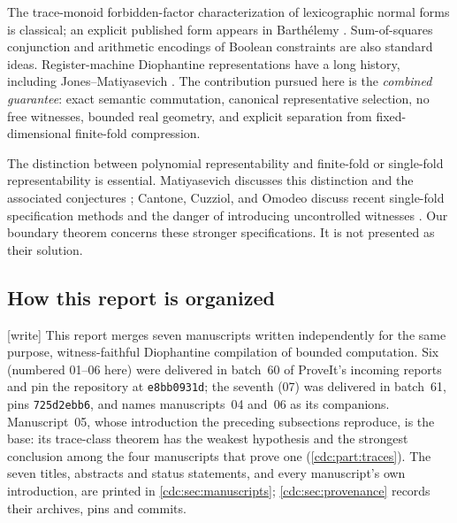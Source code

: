 \documentclass[11pt,a4paper]{article}
\theoremstyle{definition}
\theoremstyle{remark}
\newcommand{\wtag}{\textup{[write]}}%
\begin{document}
The trace-monoid forbidden-factor characterization of lexicographic normal forms is classical; an explicit published form appears in Barth\'elemy \cite{barthelemy}. Sum-of-squares conjunction and arithmetic encodings of Boolean constraints are also standard ideas. Register-machine Diophantine representations have a long history, including Jones--Matiyasevich \cite{jm1984}. The contribution pursued here is the \emph{combined guarantee}: exact semantic commutation, canonical representative selection, no free witnesses, bounded real geometry, and explicit separation from fixed-dimensional finite-fold compression.

The distinction between polynomial representability and finite-fold or single-fold representability is essential. Matiyasevich discusses this distinction and the associated conjectures \cite{mat2010}; Cantone, Cuzziol, and Omodeo discuss recent single-fold specification methods and the danger of introducing uncontrolled witnesses \cite{cco2024}. Our boundary theorem concerns these stronger specifications. It is not presented as their solution.


\subsection{How this report is organized}\label{cdc:sec:organization}
\wtag{} This report merges seven manuscripts written independently for the same purpose, witness-faithful Diophantine compilation of bounded computation. Six (numbered 01--06 here) were delivered in batch~60 of ProveIt's incoming reports and pin the repository at \texttt{e8bb0931d}; the seventh (07) was delivered in batch~61, pins \texttt{725d2ebb6}, and names manuscripts~04 and~06 as its companions. Manuscript~05, whose introduction the preceding subsections reproduce, is the base: its trace-class theorem has the weakest hypothesis and the strongest conclusion among the four manuscripts that prove one (\cref{cdc:part:traces}). The seven titles, abstracts and status statements, and every manuscript's own introduction, are printed in \cref{cdc:sec:manuscripts}; \cref{cdc:sec:provenance} records their archives, pins and commits.
\end{document}
